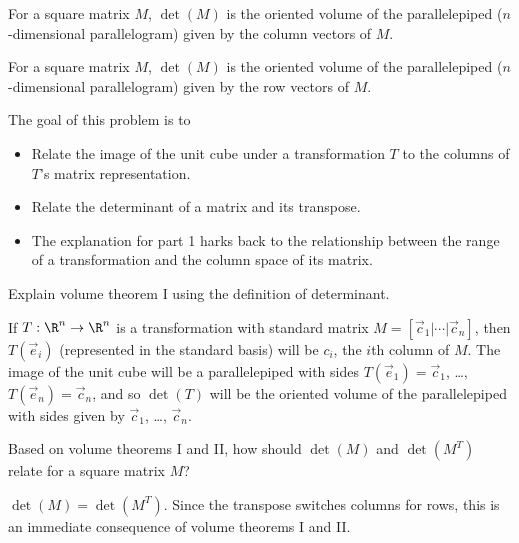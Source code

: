 	\begin{theorem}
		For a square matrix $M$, $\det(M)$ is the oriented volume of the parallelepiped
		($n$-dimensional parallelogram) given by the column vectors of $M$.
	\end{theorem}
	\begin{theorem}
		For a square matrix $M$, $\det(M)$ is the oriented volume of the parallelepiped
		($n$-dimensional parallelogram) given by the row vectors of $M$.
	\end{theorem}
	\question
	\begin{annotation}
		\begin{goals}

			The goal of this problem is to
			\begin{itemize}
				\item Relate the image of the unit cube under a transformation $T$ to the columns
					of $T$'s matrix representation.
				\item Relate the determinant of a matrix and its transpose.
			\end{itemize}
		\end{goals}

		\begin{notes}
			\begin{itemize}
				\item The explanation for part 1 harks back to the relationship between
					the range of a transformation and the column space of its matrix.
			\end{itemize}
		\end{notes}
	\end{annotation}
	\begin{parts}
		\item Explain volume theorem I using the definition of determinant.
			\begin{solution}
				If $T:\R^n\to\R^n$ is a transformation with standard matrix $M=[\vec c_1|\cdots|\vec c_n]$,
				then
				$T(\vec e_i)$ (represented in the standard basis) will be $c_i$, the $i$th
				column of $M$. The image of the unit cube will be a parallelepiped
				with sides $T(\vec e_1)=\vec c_1$, \ldots, $T(\vec e_n)=\vec c_n$, and so $\det(T)$
				will be the oriented volume of the parallelepiped with sides given by $\vec c_1$, \ldots, $\vec c_n$.
			\end{solution}
		\item Based on volume theorems I and II, how should $\det(M)$ and $\det(M^T)$
			relate for a square matrix $M$?
			\begin{solution}
				$\det(M)=\det(M^T)$. Since the transpose switches columns for rows,
				this is an immediate consequence of volume theorems I and II.
			\end{solution}
	\end{parts}

